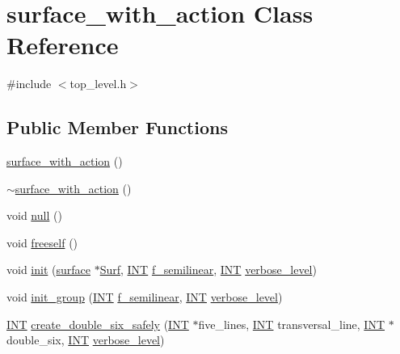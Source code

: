 \hypertarget{classsurface__with__action}{}\section{surface\+\_\+with\+\_\+action Class Reference}
\label{classsurface__with__action}


{\ttfamily \#include $<$top\+\_\+level.\+h$>$}

\subsection*{Public Member Functions}
\begin{DoxyCompactItemize}
\item 
\mbox{\hyperlink{classsurface__with__action_aa6d83ae08348e8b146997e47a92078e3}{surface\+\_\+with\+\_\+action}} ()
\item 
\mbox{\hyperlink{classsurface__with__action_acc971eeecd7a30c46d9e2ac48d2ec400}{$\sim$surface\+\_\+with\+\_\+action}} ()
\item 
void \mbox{\hyperlink{classsurface__with__action_af5af15d7550135fbfb1d5211f69aa457}{null}} ()
\item 
void \mbox{\hyperlink{classsurface__with__action_a51a00cbb190080e05ff446634023a454}{freeself}} ()
\item 
void \mbox{\hyperlink{classsurface__with__action_a8e716ca96b2dd1833dbbb0e3711b9435}{init}} (\mbox{\hyperlink{classsurface}{surface}} $\ast$\mbox{\hyperlink{classsurface__with__action_a28f1189bfbd4aeca4a38ea6e8dffdecc}{Surf}}, \mbox{\hyperlink{galois_8h_a09fddde158a3a20bd2dcadb609de11dc}{I\+NT}} \mbox{\hyperlink{classsurface__with__action_a292234b69668cc2b04a3748a07d655fa}{f\+\_\+semilinear}}, \mbox{\hyperlink{galois_8h_a09fddde158a3a20bd2dcadb609de11dc}{I\+NT}} \mbox{\hyperlink{simeon_8_c_a818073fbcc2f439e7c56952f67386122}{verbose\+\_\+level}})
\item 
void \mbox{\hyperlink{classsurface__with__action_a8fc5e9fd211eaca0a5e4a922aa515d8b}{init\+\_\+group}} (\mbox{\hyperlink{galois_8h_a09fddde158a3a20bd2dcadb609de11dc}{I\+NT}} \mbox{\hyperlink{classsurface__with__action_a292234b69668cc2b04a3748a07d655fa}{f\+\_\+semilinear}}, \mbox{\hyperlink{galois_8h_a09fddde158a3a20bd2dcadb609de11dc}{I\+NT}} \mbox{\hyperlink{simeon_8_c_a818073fbcc2f439e7c56952f67386122}{verbose\+\_\+level}})
\item 
\mbox{\hyperlink{galois_8h_a09fddde158a3a20bd2dcadb609de11dc}{I\+NT}} \mbox{\hyperlink{classsurface__with__action_a5d151dc90786f5466eb08dc1e2939170}{create\+\_\+double\+\_\+six\+\_\+safely}} (\mbox{\hyperlink{galois_8h_a09fddde158a3a20bd2dcadb609de11dc}{I\+NT}} $\ast$five\+\_\+lines, \mbox{\hyperlink{galois_8h_a09fddde158a3a20bd2dcadb609de11dc}{I\+NT}} transversal\+\_\+line, \mbox{\hyperlink{galois_8h_a09fddde158a3a20bd2dcadb609de11dc}{I\+NT}} $\ast$double\+\_\+six, \mbox{\hyperlink{galois_8h_a09fddde158a3a20bd2dcadb609de11dc}{I\+NT}} \mbox{\hyperlink{simeon_8_c_a818073fbcc2f439e7c56952f67386122}{verbose\+\_\+level}})

\end{DoxyCompactItemize}
